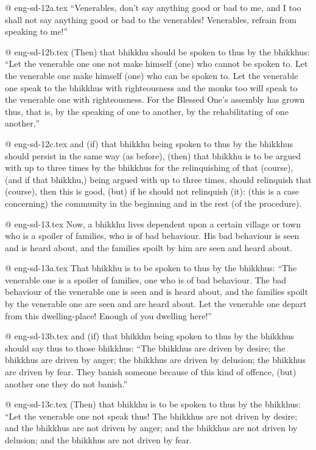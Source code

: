 @ eng-sd-12a.tex
“Venerables, don't say anything good or bad to me, and I too shall not say anything good or bad to the venerables! Venerables, refrain from speaking to me!”

@ eng-sd-12b.tex
(Then) that bhikkhu should be spoken to thus by the bhikkhus: “Let the venerable one one not make himself (one) who cannot be spoken to. Let the venerable one make himself (one) who can be spoken to. Let the venerable one speak to the bhikkhus with righteousness and the monks too will speak to the venerable one with righteousness. For the Blessed One's assembly has grown thus, that is, by the speaking of one to another, by the rehabilitating of one another,”

@ eng-sd-12c.tex
and (if) that bhikkhu being spoken to thus by the bhikkhus should persist in the same way (as before), (then) that bhikkhu is to be argued with up to three times by the bhikkhus for the relinquishing of that (course), (and if that bhikkhu,) being argued with up to three times, should relinquish that (course), then this is good, (but) if he should not relinquish (it): (this is a case concerning) the community in the beginning and in the rest (of the procedure).

@ eng-sd-13.tex
Now, a bhikkhu lives dependent upon a certain village or town who is a spoiler of families, who is of bad behaviour. His bad behaviour is seen and is heard about, and the families spoilt by him are seen and heard about. 

@ eng-sd-13a.tex
That bhikkhu is to be spoken to thus by the bhikkhus: “The venerable one is a spoiler of families, one who is of bad behaviour. The bad behaviour of the venerable one is seen and is heard about, and the families spoilt by the venerable one are seen and are heard about. Let the venerable one depart from this dwelling-place! Enough of you dwelling here!”

@ eng-sd-13b.tex
and (if) that bhikkhu being spoken to thus by the bhikkhus should say thus to those bhikkhus: “The bhikkhus are driven by desire; the bhikkhus are driven by anger; the bhikkhus are driven by delusion; the bhikkhus are driven by fear. They banish someone because of this kind of offence, (but) another one they do not banish.”

@ eng-sd-13c.tex
(Then) that bhikkhu is to be spoken to thus by the bhikkhus: “Let the venerable one not speak thus! The bhikkhus are not driven by desire; and the bhikkhus are not driven by anger; and the bhikkhus are not driven by delusion; and the bhikkhus are not driven by fear.

